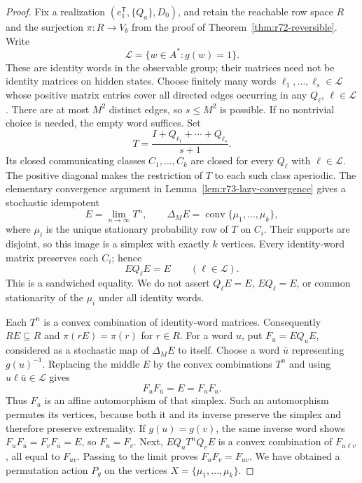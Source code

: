 \begin{proof}
Fix a realization $(e_1^{\mathsf T},\{Q_a\},D_0)$, and retain the reachable
row space $R$ and the surjection $\pi:R\to V_b$ from the proof of
Theorem~\ref{thm:r72-reversible}. Write
\[
 \mathcal L=\{w\in A^*:g(w)=1\}.
\]
These are identity words in the observable group; their matrices need not be
identity matrices on hidden states. Choose finitely many words
$\ell_1,\ldots,\ell_s\in\mathcal L$ whose positive matrix entries cover all
directed edges occurring in any $Q_\ell$, $\ell\in\mathcal L$. There are at
most $M^2$ distinct edges, so $s\le M^2$ is possible. If no nontrivial choice
is needed, the empty word suffices. Set
\[
 T=\frac{I+Q_{\ell_1}+\cdots+Q_{\ell_s}}{s+1}.
\]
Its closed communicating classes $C_1,\ldots,C_k$ are closed for every
$Q_\ell$ with $\ell\in\mathcal L$. The positive diagonal makes the
restriction of $T$ to each such class aperiodic. The elementary convergence
argument in Lemma~\ref{lem:r73-lazy-convergence} gives a stochastic idempotent
\[
 E=\lim_{n\to\infty}T^n,
 \qquad
 \Delta_ME=\operatorname{conv}\{\mu_1,\ldots,\mu_k\},
\]
where $\mu_i$ is the unique stationary probability row of $T$ on $C_i$.
Their supports are disjoint, so this image is a simplex with exactly $k$
vertices. Every identity-word matrix preserves each $C_i$; hence
\begin{equation}\label{eq:r73-sandwich}
 EQ_\ell E=E\qquad(\ell\in\mathcal L).
\end{equation}
This is a sandwiched equality. We do not assert $Q_\ell E=E$, $EQ_\ell=E$,
or common stationarity of the $\mu_i$ under all identity words.

Each $T^n$ is a convex combination of identity-word matrices. Consequently
$RE\subseteq R$ and $\pi(rE)=\pi(r)$ for $r\in R$. For a word $u$, put
$F_u=EQ_uE$, considered as a stochastic map of $\Delta_ME$ to itself.
Choose a word $\bar u$ representing $g(u)^{-1}$. Replacing the middle $E$
by the convex combinations $T^n$ and using
$u\ell\bar u\in\mathcal L$ gives
\[
 F_uF_{\bar u}=E=F_{\bar u}F_u.
\]
Thus $F_u$ is an affine automorphism of that simplex. Such an automorphism
permutes its vertices, because both it and its inverse preserve the simplex
and therefore preserve extremality. If $g(u)=g(v)$, the same inverse word
shows $F_uF_{\bar u}=F_vF_{\bar u}=E$, so $F_u=F_v$. Next,
$EQ_uT^nQ_vE$ is a convex combination of $F_{u\ell v}$, all equal to
$F_{uv}$. Passing to the limit proves $F_uF_v=F_{uv}$. We have obtained a
permutation action $P_g$ on the vertices $X=\{\mu_1,\ldots,\mu_k\}$.


\end{proof}
